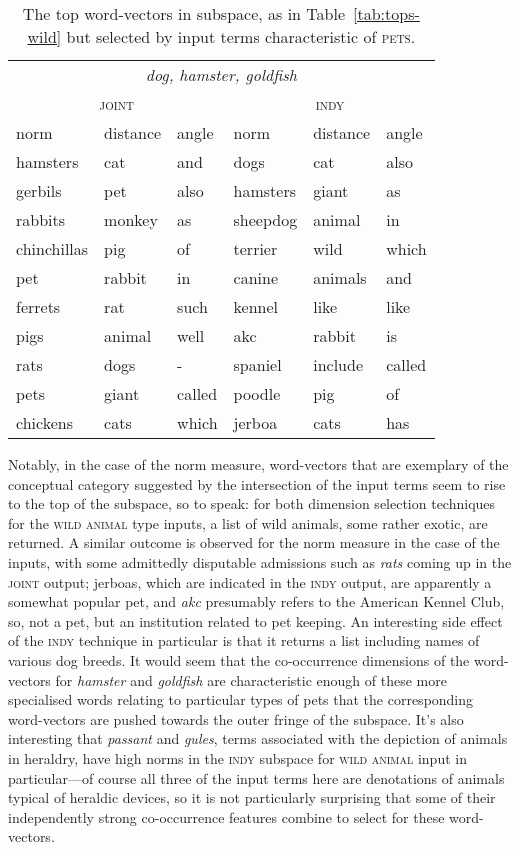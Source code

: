 \begin{table} \label{tab:pet}
\centering
\begin{tabular}{lll|lll}
\hline
\multicolumn{6}{c}{\emph{dog, hamster, goldfish}} \\
\multicolumn{3}{c}{\textsc{joint}} & \multicolumn{3}{c}{\textsc{indy}} \\
\hline
norm & distance & angle & norm & distance & angle \\
\hline
hamsters & cat & and & dogs & cat & also \\
gerbils & pet & also & hamsters & giant & as \\
rabbits & monkey & as & sheepdog & animal & in \\
chinchillas & pig & of & terrier & wild & which \\
pet & rabbit & in & canine & animals & and \\
ferrets & rat & such & kennel & like & like \\
pigs & animal & well & akc & rabbit & is \\
rats & dogs & - & spaniel & include & called \\
pets & giant & called & poodle & pig & of \\
chickens & cats & which & jerboa & cats & has \\
\hline
\end{tabular}
\caption{The top word-vectors in subspace, as in Table~\ref{tab:tops-wild} but selected by input terms characteristic of \textsc{pets}.}
\label{tab:tops-pet}
\end{table}

Notably, in the case of the norm measure, word-vectors that are exemplary of the conceptual category suggested by the intersection of the input terms seem to rise to the top of the subspace, so to speak: for both dimension selection techniques for the \textsc{wild animal} type inputs, a list of wild animals, some rather exotic, are returned.  A similar outcome is observed for the norm measure in the case of the  inputs, with some admittedly disputable admissions such as \emph{rats} coming up in the \textsc{joint} output; jerboas, which are indicated in the \textsc{indy} output, are apparently a somewhat popular pet, and \emph{akc} presumably refers to the American Kennel Club, so, not a pet, but an institution related to pet keeping.  An interesting side effect of the \textsc{indy} technique in particular is that it returns a list including names of various dog breeds.  It would seem that the co-occurrence dimensions of the word-vectors for \emph{hamster} and \emph{goldfish} are characteristic enough of these more specialised words relating to particular types of pets that the corresponding word-vectors are pushed towards the outer fringe of the subspace.  It's also interesting that \emph{passant} and \emph{gules}, terms associated with the depiction of animals in heraldry, have high norms in the \textsc{indy} subspace for \textsc{wild animal} input in particular---of course all three of the input terms here are denotations of animals typical of heraldic devices, so it is not particularly surprising that some of their independently strong co-occurrence features combine to select for these word-vectors.

